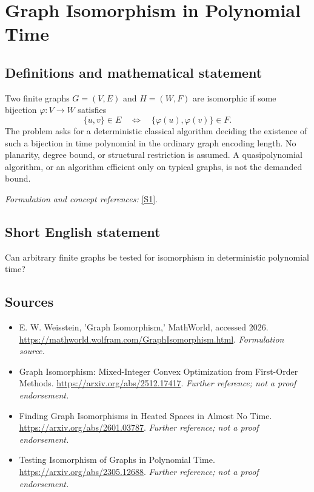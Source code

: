 \documentclass[11pt]{article}
\begin{document}
\section*{\texorpdfstring{Graph Isomorphism in Polynomial Time}{Graph Isomorphism in Polynomial Time}}\label{statement}
\subsection{Definitions and mathematical statement}
Two finite graphs $G=(V,E)$ and $H=(W,F)$ are isomorphic if some bijection $\varphi:V\to W$ satisfies
\[
 \{u,v\}\in E\quad\Longleftrightarrow\quad\{\varphi(u),\varphi(v)\}\in F.
\]
The problem asks for a deterministic classical algorithm deciding the existence of such a bijection in time polynomial in the ordinary graph encoding length. No planarity, degree bound, or structural restriction is assumed. A quasipolynomial algorithm, or an algorithm efficient only on typical graphs, is not the demanded bound.
\par\smallskip\textit{Formulation and concept references:} \href{https://mathworld.wolfram.com/GraphIsomorphism.html}{[S1]}.

\subsection{Short English statement}
Can arbitrary finite graphs be tested for isomorphism in deterministic polynomial time?
\subsection{Sources}
\begin{itemize}
\item[S1]E. W. Weisstein, 'Graph Isomorphism,' MathWorld, accessed 2026.
\url{https://mathworld.wolfram.com/GraphIsomorphism.html}.
\textit{Formulation source.}
\item[S2]Graph Isomorphism: Mixed-Integer Convex Optimization from First-Order Methods.
\url{https://arxiv.org/abs/2512.17417}.
\textit{Further reference; not a proof endorsement.}
\item[S3]Finding Graph Isomorphisms in Heated Spaces in Almost No Time.
\url{https://arxiv.org/abs/2601.03787}.
\textit{Further reference; not a proof endorsement.}
\item[S4]Testing Isomorphism of Graphs in Polynomial Time.
\url{https://arxiv.org/abs/2305.12688}.
\textit{Further reference; not a proof endorsement.}
\end{itemize}
\end{document}
